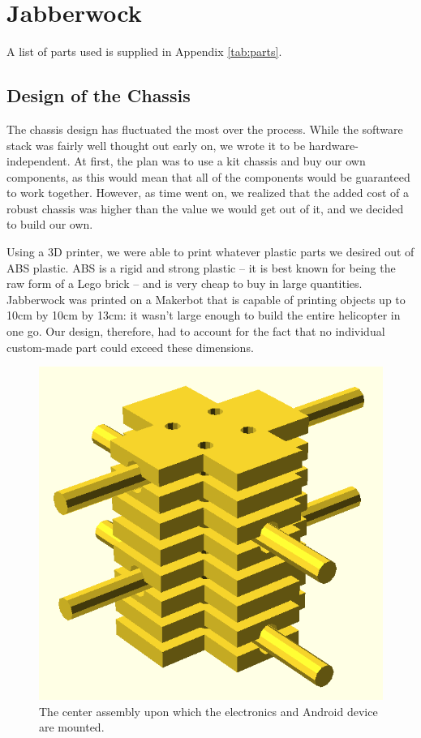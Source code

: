 \documentclass[letterpaper]{article}
\begin{document}
\section{Jabberwock}
A list of parts used is supplied in Appendix \ref{tab:parts}.

\subsection{Design of the Chassis}
The chassis design has fluctuated the most over the process. While the
software stack was fairly well thought out early on, we wrote it to be
hardware-independent. At first, the plan was to use a kit chassis and
buy our own components, as this would mean that all of the components
would be guaranteed to work together. However, as time went on, we
realized that the added cost of a robust chassis was higher than the
value we would get out of it, and we decided to build our own.

Using a 3D printer, we were able to print whatever plastic parts we
desired out of ABS plastic. ABS is a rigid and strong plastic -- it is
best known for being the raw form of a Lego brick -- and is very cheap
to buy in large quantities. Jabberwock was printed on a Makerbot that
is capable of printing objects up to 10cm by 10cm by 13cm: it
wasn't large enough to build the entire helicopter in one go. Our
design, therefore, had to account for the fact that no individual
custom-made part could exceed these dimensions.

\begin{figure}[htb]
  \centering
  \includegraphics[scale=0.4]{figures/brock_assembly}
  \caption{The center assembly upon which the electronics and Android
    device are mounted.}
  \label{fig:brock}
\end{figure}
\end{document}
